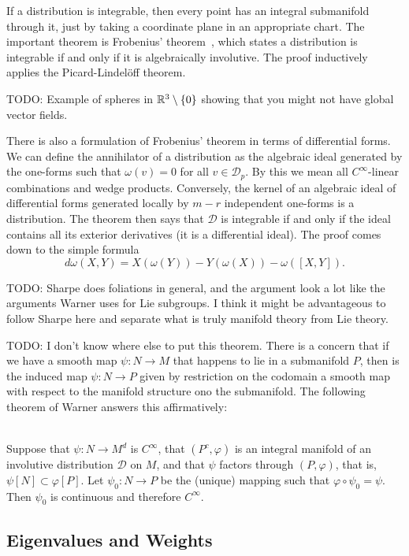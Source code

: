 If a distribution is integrable, then every point has an integral submanifold through it, just by taking a coordinate plane in an appropriate chart.
The important theorem is Frobenius' theorem~\cite[2.4.1]{Sharpe1997}, which states a distribution is integrable if and only if it is algebraically involutive.
The proof inductively applies the Picard-Lindelöff theorem.

TODO: Example of spheres in $\mathbb{R}^3\setminus\{0\}$ showing that you might not have global vector fields.

There is also a formulation of Frobenius' theorem in terms of differential forms.
We can define the annihilator of a distribution as the algebraic ideal generated by the one-forms such that $\omega(v) = 0$ for all $v \in \mathcal{D}_p$.
By this we mean all $C^\infty$-linear combinations and wedge products.
Conversely, the kernel of an algebraic ideal of differential forms generated locally by $m-r$ independent one-forms is a distribution.
The theorem then says that $\mathcal{D}$ is integrable if and only if the ideal contains all its exterior derivatives (it is a differential ideal).
The proof comes down to the simple formula
\[
d\omega(X,Y) = X(\omega(Y)) - Y(\omega(X)) - \omega([X,Y]).
\]

TODO: Sharpe does foliations in general, and the argument look a lot like the arguments Warner uses for Lie subgroups.
I think it might be advantageous to follow Sharpe here and separate what is truly manifold theory from Lie theory.


TODO: I don't know where else to put this theorem.
There is a concern that if we have a smooth map $\psi: N \to M$ that happens to lie in a submanifold $P$, then is the induced map $\psi : N \to P$ given by restriction on the codomain a smooth map with respect to the manifold structure ono the submanifold.
The following theorem of Warner answers this affirmatively:
\begin{theorem}\label{theorem:cinfty}
\textup{\cite[1.62]{Warner1983}}\\
Suppose that $\psi \colon N \to M^d$ is $C^{\infty}$, that $(P^c,\varphi)$ is an integral manifold of an involutive distribution $\mathcal{D}$ on $M$, and that $\psi$ factors through $(P,\varphi)$, that is, $\psi[N] \subset \varphi[P]$. Let $\psi_0 : N \to P$ be the (unique) mapping such that $\varphi\circ \psi_0 = \psi$. Then $\psi_0$ is continuous and therefore $C^{\infty}$.
\end{theorem}

\subsection{Eigenvalues and Weights}


